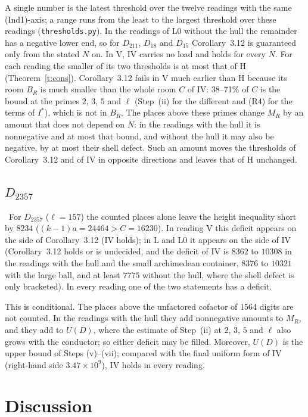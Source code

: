 \documentclass[11pt,a4paper]{article}
\newcommand{\Ht}{\mathrm{H}}
\newcommand{\lab}[2]{{\upshape\fcolorbox{#1}{#1!8}{\scriptsize\sffamily\bfseries\textcolor{#1}{#2}}}}
\newcommand{\tagP}{\lab{ForestGreen}{P}}
\theoremstyle{plain}
\theoremstyle{definition}
\theoremstyle{remark}
\begin{document}
A single number is the latest threshold over the twelve readings with the same (Ind1)-axis; a range runs from the least
to the largest threshold over these readings (\texttt{thresholds.py}). In the readings of L0 without the hull the
remainder has a negative lower end, so for $D_{211}$, $D_{18}$ and $D_{15}$ Corollary~3.12 is guaranteed only from the
stated $N$ on. In V, IV carries no load and holds for every $N$. For each reading the smaller of its two thresholds is at
most that of $\Ht$ (Theorem~\ref{t:cons}). Corollary~3.12 fails in V much earlier than $\Ht$ because its room $B_R$ is
much smaller than the whole room $C$ of IV: 38--71\% of $C$ is the bound at the primes $2$, $3$, $5$ and $\ell$
(Step~(ii) for the different and (R4) for the terms of $I^*$), which is not in $B_R$. The places above these primes change
$M_R$ by an amount that does not depend on $N$: in the readings with the hull it is nonnegative and at most that bound,
and without the hull it may also be negative, by at most their shell defect. Such an amount moves the thresholds of
Corollary~3.12 and of IV in opposite directions and leaves that of $\Ht$ unchanged.

\subsection{\texorpdfstring{$D_{2357}$}{D2357}}\label{ss:d2357}
\tagP\ For $D_{2357}$ ($\ell=157$) the counted places alone leave the height inequality short by $8234$
($(k-1)a=24464>C=16230$). In reading V this deficit appears on the side of Corollary~3.12 (IV holds); in L and L0 it
appears on the side of IV (Corollary~3.12 holds or is undecided, and the deficit of IV is $8362$ to $10308$ in the
readings with the hull and the small archimedean container, $8376$ to $10321$ with the large ball, and at least $7775$
without the hull, where the shell defect is only bracketed). In every reading one of the two statements has a deficit.

This is conditional. The places above the unfactored cofactor of 1564 digits are not counted. In the readings with the
hull they add nonnegative amounts to $M_R$, and they add to $U(D)$, where the estimate of Step~(ii) at $2$, $3$, $5$ and
$\ell$ also grows with the conductor; so either deficit may be filled. Moreover, $U(D)$ is the upper bound of Steps (v)--(vii); compared with the final uniform
form of IV (right-hand side $3.47\times10^9$), IV holds in every reading.

\section{Discussion}\label{s:disc}
\end{document}
